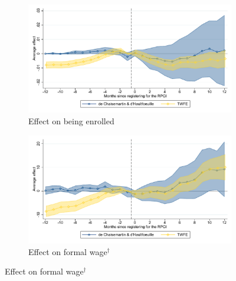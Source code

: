\documentclass[10pt, oneside]{book}
\begin{document}
\begin{figure}[H]
    \centering
    \caption{Event studies - RPCI effect on enrollment and wages \label{fig:event_study_rpci}}
    
    \begin{subfigure}{0.49\textwidth}
    \caption{Effect on being enrolled}
    \includegraphics[width=\textwidth]{04_Figures/muestra_10porciento/event_study_alta_connected.pdf}
    \end{subfigure}
    \begin{subfigure}{0.49\textwidth}
    \caption{Effect on formal wage$^\dagger$}
    \includegraphics[width=\textwidth]{04_Figures/muestra_10porciento/event_study_sal_formal_connected.pdf}
    \end{subfigure}
    

\end{figure}
\end{document}
